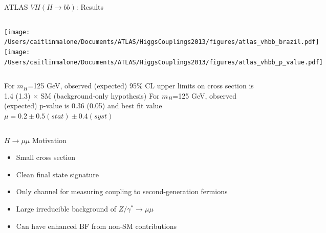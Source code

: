 \documentclass{beamer}
\begin{document}
\begin{frame}{ATLAS $VH (H\rightarrow bb)$: Results}
	\begin{columns}
			\texttt{[image: /Users/caitlinmalone/Documents/ATLAS/HiggsCouplings2013/figures/atlas\_vhbb\_brazil.pdf]}
			\texttt{[image: /Users/caitlinmalone/Documents/ATLAS/HiggsCouplings2013/figures/atlas\_vhbb\_p\_value.pdf]}
	\end{columns}
		
	\begin{columns}[c]
		\column{0.5\textwidth}
			\scriptsize
			For $m_H$=125 GeV, observed (expected) 95\% CL upper limits on cross section is 1.4 (1.3) $\times$ SM (background-only hypothesis)
		\column{0.5\textwidth}
			\scriptsize
			For $m_H$=125 GeV, observed (expected) p-value is 0.36 (0.05) and best fit value $\mu=0.2\pm0.5(stat)\pm0.4(syst)$
	\end{columns}
\end{frame}





\begin{frame}{$H\rightarrow\mu \mu$ Motivation}
	\begin{itemize}
		\item Small cross section
		\item Clean final state signature
		\item Only channel for measuring coupling to second-generation fermions
		\item Large irreducible background of $Z/\gamma^*\rightarrow\mu\mu$
		\item Can have enhanced BF from non-SM contributions
	\end{itemize}
\end{frame}
\end{document}
